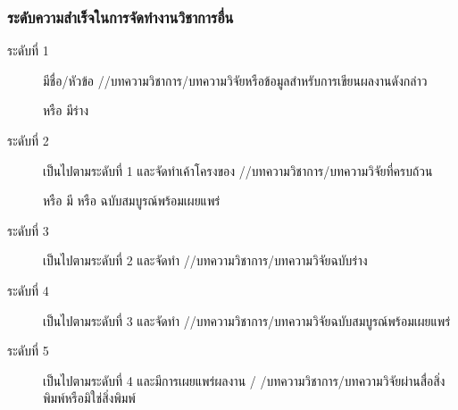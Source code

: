 \documentclass[a4paper,12pt,english]{sphinxmanual}
\begin{document}
\subsubsection{ระดับความสำเร็จในการจัดทำงานวิชาการอื่น}
\label{\detokenize{submission_part1:id14}}\begin{description}
\item[{ระดับที่ 1}] \leavevmode
มีชื่อ/หัวข้อ {\hyperref[\detokenize{glossary:term-3}]{}}/{\hyperref[\detokenize{glossary:term-2}]{}}/บทความวิชาการ/บทความวิจัยหรือข้อมูลสำหรับการเขียนผลงานดังกล่าว

หรือ มีร่าง {\hyperref[\detokenize{glossary:term-0}]{}}

\item[{ระดับที่ 2}] \leavevmode
เป็นไปตามระดับที่ 1 และจัดทำเค้าโครงของ {\hyperref[\detokenize{glossary:term-3}]{}}/{\hyperref[\detokenize{glossary:term-2}]{}}/บทความวิชาการ/บทความวิจัยที่ครบถ้วน

หรือ มี {\hyperref[\detokenize{glossary:term-0}]{}}  หรือ {\hyperref[\detokenize{glossary:term-1}]{}} ฉบับสมบูรณ์พร้อมเผยแพร่

\item[{ระดับที่ 3}] \leavevmode
เป็นไปตามระดับที่ 2 และจัดทำ {\hyperref[\detokenize{glossary:term-3}]{}}/{\hyperref[\detokenize{glossary:term-2}]{}}/บทความวิชาการ/บทความวิจัยฉบับร่าง

\item[{ระดับที่ 4}] \leavevmode
เป็นไปตามระดับที่ 3 และจัดทำ {\hyperref[\detokenize{glossary:term-3}]{}}/{\hyperref[\detokenize{glossary:term-2}]{}}/บทความวิชาการ/บทความวิจัยฉบับสมบูรณ์พร้อมเผยแพร่

\item[{ระดับที่ 5}] \leavevmode
เป็นไปตามระดับที่ 4 และมีการเผยแพร่ผลงาน {\hyperref[\detokenize{glossary:term-3}]{}}/ {\hyperref[\detokenize{glossary:term-2}]{}}/บทความวิชาการ/บทความวิจัยผ่านสื่อสิ่งพิมพ์หรือมิใช่สิ่งพิมพ์

\end{description}
\end{document}
